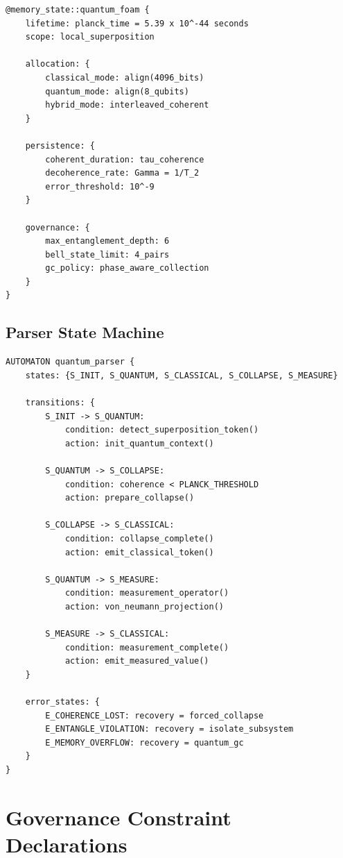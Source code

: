 \documentclass[12pt,a4paper]{article}
\begin{document}
\begin{lstlisting}[style=riftlang,caption={Quantum Memory Management}]
@memory_state::quantum_foam {
    lifetime: planck_time = 5.39 x 10^-44 seconds
    scope: local_superposition
    
    allocation: {
        classical_mode: align(4096_bits)
        quantum_mode: align(8_qubits)
        hybrid_mode: interleaved_coherent
    }
    
    persistence: {
        coherent_duration: tau_coherence
        decoherence_rate: Gamma = 1/T_2
        error_threshold: 10^-9
    }
    
    governance: {
        max_entanglement_depth: 6
        bell_state_limit: 4_pairs
        gc_policy: phase_aware_collection
    }
}
\end{lstlisting}

\subsection{Parser State Machine}

\begin{lstlisting}[style=riftlang,caption={Quantum Parser Automaton}]
AUTOMATON quantum_parser {
    states: {S_INIT, S_QUANTUM, S_CLASSICAL, S_COLLAPSE, S_MEASURE}
    
    transitions: {
        S_INIT -> S_QUANTUM: 
            condition: detect_superposition_token()
            action: init_quantum_context()
            
        S_QUANTUM -> S_COLLAPSE:
            condition: coherence < PLANCK_THRESHOLD
            action: prepare_collapse()
            
        S_COLLAPSE -> S_CLASSICAL:
            condition: collapse_complete()
            action: emit_classical_token()
            
        S_QUANTUM -> S_MEASURE:
            condition: measurement_operator()
            action: von_neumann_projection()
            
        S_MEASURE -> S_CLASSICAL:
            condition: measurement_complete()
            action: emit_measured_value()
    }
    
    error_states: {
        E_COHERENCE_LOST: recovery = forced_collapse
        E_ENTANGLE_VIOLATION: recovery = isolate_subsystem
        E_MEMORY_OVERFLOW: recovery = quantum_gc
    }
}
\end{lstlisting}

\section{Governance Constraint Declarations}
\end{document}

